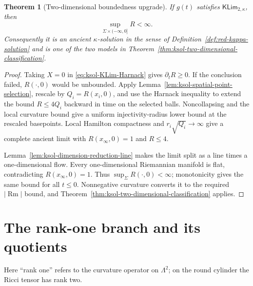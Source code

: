 \documentclass[10pt]{coll-l}
\newtheorem{theorem}{Theorem}[chapter]
\theoremstyle{definition}
\theoremstyle{remark}
\numberwithin{section}{chapter}
\numberwithin{equation}{chapter}
\newcommand{\Rm}{\operatorname{Rm}}
\begin{document}
\begin{theorem}[Two-dimensional boundedness upgrade]
\label{thm:ksol-two-dimensional-KLim-bounded}
If $g(t)$ satisfies $\mathsf{KLim}_{2,\kappa}$, then
\begin{equation}
              \sup_{\Sigma\times(-\infty,0]}R<\infty.  \label{eq:ksol-KLim2-global-bound}
\end{equation}
Consequently it is an ancient $\kappa$-solution in the sense of
Definition~\ref{def:red-kappa-solution} and is one of the two models in
Theorem~\ref{thm:ksol-two-dimensional-classification}.
\end{theorem}

\begin{proof}
Taking $X=0$ in \eqref{eq:ksol-KLim-Harnack} gives $\partial_tR\geq0$.
If the conclusion failed, $R(\cdot,0)$ would be unbounded.  Apply
Lemma~\ref{lem:ksol-spatial-point-selection}, rescale by
$Q_i=R(x_i,0)$, and use the Harnack inequality to extend the bound
$R\leq4Q_i$ backward in time on the selected balls.  Noncollapsing and the
local curvature bound give a uniform injectivity-radius lower bound at the
rescaled basepoints.  Local Hamilton compactness and
$r_i\sqrt{Q_i}\to\infty$ give a complete ancient limit with
$R(x_\infty,0)=1$ and $R\leq4$.

Lemma~\ref{lem:ksol-dimension-reduction-line} makes the limit split as a
line times a one-dimensional flow.  Every one-dimensional Riemannian
manifold is flat, contradicting $R(x_\infty,0)=1$.  Thus
$\sup_\Sigma R(\cdot,0)<\infty$; monotonicity gives the same bound for all
$t\leq0$.  Nonnegative curvature converts it to the required $|\Rm|$ bound,
and Theorem~\ref{thm:ksol-two-dimensional-classification} applies.
\end{proof}

\section{The rank-one branch and its quotients}
\label{sec:ksol-split-branch}

Here ``rank one'' refers to the curvature operator on $\Lambda^2$; on the
round cylinder the Ricci tensor has rank two.
\end{document}
